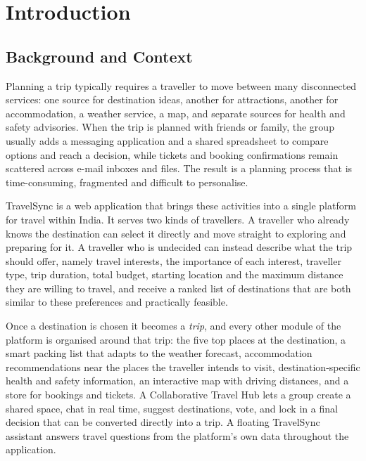 
\chapter{Introduction}

\section{Background and Context}

Planning a trip typically requires a traveller to move between many
disconnected services: one source for destination ideas, another for
attractions, another for accommodation, a weather service, a map, and
separate sources for health and safety advisories. When the trip is planned
with friends or family, the group usually adds a messaging application and a
shared spreadsheet to compare options and reach a decision, while tickets and
booking confirmations remain scattered across e-mail inboxes and files. The
result is a planning process that is time-consuming, fragmented and difficult
to personalise.

TravelSync is a web application that brings these activities into a single
platform for travel within India. It serves two kinds of travellers. A
traveller who already knows the destination can select it directly and move
straight to exploring and preparing for it. A traveller who is undecided can
instead describe what the trip should offer, namely travel interests, the
importance of each interest, traveller type, trip duration, total budget,
starting location and the maximum distance they are willing to travel, and
receive a ranked list of destinations that are both similar to these
preferences and practically feasible.

Once a destination is chosen it becomes a \emph{trip}, and every other
module of the platform is organised around that trip: the five top places at
the destination, a smart packing list that adapts to the weather forecast,
accommodation recommendations near the places the traveller intends to visit,
destination-specific health and safety information, an interactive map with
driving distances, and a store for bookings and tickets. A Collaborative
Travel Hub lets a group create a shared space, chat in real time, suggest
destinations, vote, and lock in a final decision that can be converted
directly into a trip. A floating TravelSync assistant answers travel questions
from the platform's own data throughout the application.

